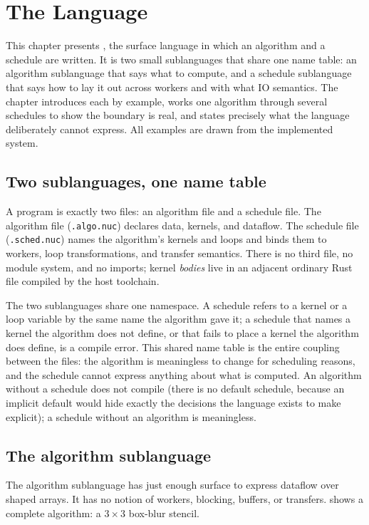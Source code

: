 \chapter{The \nuclang{} Language}\label{ch:language}

This chapter presents \nuclang{}, the surface language in which an algorithm and
a schedule are written. It is two small sublanguages that share one name table:
an algorithm sublanguage that says what to compute, and a schedule sublanguage
that says how to lay it out across workers and with what IO semantics. The
chapter introduces each by example, works one algorithm through several
schedules to show the boundary is real, and states precisely what the language
deliberately cannot express. All examples are drawn from the implemented system.

\section{Two sublanguages, one name table}\label{sec:lang-two}

A program is exactly two files: an algorithm file and a schedule file. The
algorithm file (\texttt{.algo.nuc}) declares data, kernels, and dataflow. The
schedule file (\texttt{.sched.nuc}) names the algorithm's kernels and loops and
binds them to workers, loop transformations, and transfer semantics. There is no
third file, no module system, and no imports; kernel \emph{bodies} live in an
adjacent ordinary Rust file compiled by the host toolchain.

The two sublanguages share one namespace. A schedule refers to a kernel or a
loop variable by the same name the algorithm gave it; a schedule that names a
kernel the algorithm does not define, or that fails to place a kernel the
algorithm does define, is a compile error. This shared name table is the entire
coupling between the files: the algorithm is meaningless to change for
scheduling reasons, and the schedule cannot express anything about what is
computed. An algorithm without a schedule does not compile (there is no default
schedule, because an implicit default would hide exactly the decisions the
language exists to make explicit); a schedule without an algorithm is
meaningless.

\section{The algorithm sublanguage}\label{sec:lang-algorithm}

The algorithm sublanguage has just enough surface to express dataflow over
shaped arrays. It has no notion of workers, blocking, buffers, or transfers.
 shows a complete algorithm: a $3\times3$ box-blur stencil.

